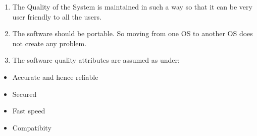 \begin{enumerate}
\item The Quality of the System is maintained in such a way so that it can be very user friendly to all the users.
\item The software should be portable. So moving from one OS to another OS does not create any problem.
\item  The software quality attributes are assumed as under:
\end{enumerate}
			
\begin{itemize}
\item Accurate and hence reliable
\item Secured
\item Fast speed
\item Compatibity
\end{itemize}



